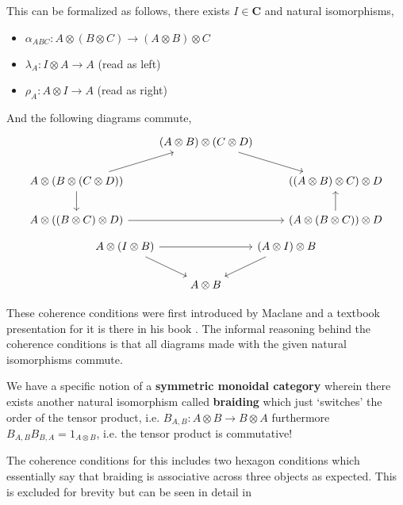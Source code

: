 \documentclass[12pt]{article}
\numberwithin{equation}{section}
\begin{document}
	This can be formalized as follows, there exists $I \in \mathbf{C}$ and natural isomorphisms,
	\begin{itemize}
		\item $\alpha_{ABC}: A \otimes (B \otimes C) \to (A \otimes B) \otimes C$
		\item $\lambda_A : I \otimes A \to A$ (read as left)
		\item $\rho_A: A \otimes I \to A$ (read as right)
	\end{itemize}
	
	And the following diagrams commute,
	\[\begin{tikzcd}
		& {(A\otimes B)\otimes (C \otimes D)} \\
		{A \otimes(B \otimes(C\otimes D))} && {((A\otimes B)\otimes C)\otimes D} \\
		{A \otimes ((B \otimes C) \otimes D)} && {(A \otimes (B\otimes C))\otimes D}
		\arrow[from=2-1, to=1-2]
		\arrow[from=1-2, to=2-3]
		\arrow[from=3-1, to=3-3]
		\arrow[from=3-3, to=2-3]
		\arrow[from=2-1, to=3-1]
	\end{tikzcd}\]
	\[\begin{tikzcd}
		{A\otimes(I\otimes B)} && {(A\otimes I)\otimes B} \\
		& {A\otimes B}
		\arrow[from=1-1, to=1-3]
		\arrow[from=1-3, to=2-2]
		\arrow[from=1-1, to=2-2]
	\end{tikzcd}\]
	
	These coherence conditions were first introduced by Maclane and a textbook presentation for it is there in his book \cite[Sec. ~VII Monoids]{lane1998categories}. The informal reasoning behind the coherence conditions is that all diagrams made with the given natural isomorphisms commute.
	
	We have a specific notion of a \textbf{symmetric monoidal category} wherein there exists another natural isomorphism called \textbf{braiding} which just `switches' the order of the tensor product, i.e. $B_{A,B}: A \otimes B \to B \otimes A  $ furthermore $B_{A,B}B_{B,A}=1_{A \otimes B}$, i.e. the tensor product is commutative!
	
	The coherence conditions for this includes two hexagon conditions which essentially say that braiding is associative across three objects as expected. This is excluded for brevity but can be seen in detail in \cite{nlab:braided_monoidal_category}	
	
\end{document}
